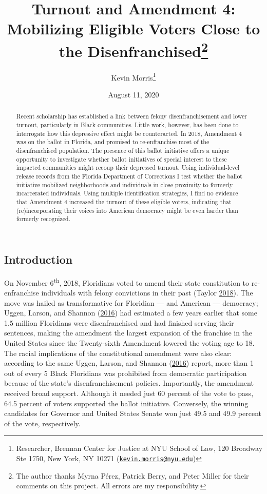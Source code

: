 \documentclass[
  12pt,
]{article}
\title{Turnout and Amendment 4: Mobilizing Eligible Voters Close to the Disenfranchised\thanks{The author thanks Myrna Pérez, Patrick Berry, and Peter Miller for their comments on this project. All errors are my responsibility.}}
\author{Kevin Morris\footnote{Researcher, Brennan Center for Justice at NYU School of Law, 120 Broadway Ste 1750, New York, NY 10271 (\href{mailto:kevin.morris@nyu.edu}{\nolinkurl{kevin.morris@nyu.edu}})}}
\date{August 11, 2020}
\begin{document}
\maketitle
\begin{abstract}
Recent scholarship has established a link between felony disenfranchisement and lower turnout, particularly in Black communities. Little work, however, has been done to interrogate how this depressive effect might be counteracted. In 2018, Amendment 4 was on the ballot in Florida, and promised to re-enfranchise most of the disenfranchised population. The presence of this ballot initiative offers a unique opportunity to investigate whether ballot initiatives of special interest to these impacted communities might recoup their depressed turnout. Using individual-level release records from the Florida Department of Corrections I test whether the ballot initiative mobilized neighborhoods and individuals in close proximity to formerly incarcerated individuals. Using multiple identification strategies, I find no evidence that Amendment 4 increased the turnout of these eligible voters, indicating that (re)incorporating their voices into American democracy might be even harder than formerly recognized.
\end{abstract}

\pagebreak

\doublespacing

\hypertarget{introduction}{%
\subsection*{Introduction}\label{introduction}}

On November 6\textsuperscript{th}, 2018, Floridians voted to amend their state constitution to re-enfranchise individuals with felony convictions in their past (Taylor \protect\hyperlink{ref-Taylor2018}{2018}). The move was hailed as transformative for Floridian --- and American --- democracy; Uggen, Larson, and Shannon (\protect\hyperlink{ref-sentencing_2016}{2016}) had estimated a few years earlier that some 1.5 million Floridians were disenfranchised and had finished serving their sentences, making the amendment the largest expansion of the franchise in the United States since the Twenty-sixth Amendment lowered the voting age to 18. The racial implications of the constitutional amendment were also clear: according to the same Uggen, Larson, and Shannon (\protect\hyperlink{ref-sentencing_2016}{2016}) report, more than 1 out of every 5 Black Floridians was prohibited from democratic participation because of the state's disenfranchisement policies. Importantly, the amendment received broad support. Although it needed just 60 percent of the vote to pass, 64.5 percent of voters supported the ballot initiative. Conversely, the winning candidates for Governor and United States Senate won just 49.5 and 49.9 percent of the vote, respectively.
\end{document}
